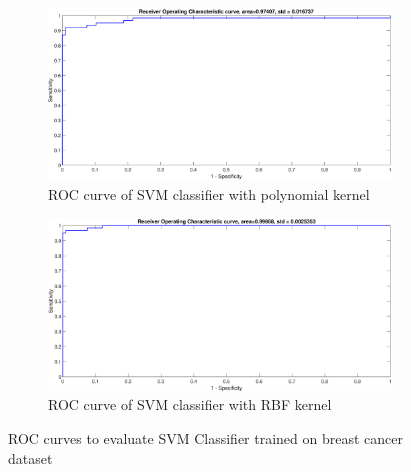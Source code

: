 \documentclass[12pt]{report}
\begin{document}
{\begin{figure}[!ht]
\begin{subfigure}{.35\textwidth}
		\includegraphics[height=.65\linewidth, width=0.9\linewidth]{breast/breast_poly_ROC.eps}
		\caption{ROC curve of SVM classifier with polynomial kernel}
		\label{fig:breast_poly_ROC}
	\end{subfigure}%
	\begin{subfigure}{.35\textwidth}
		\centering
		\captionsetup{width=0.8\linewidth}
		\includegraphics[height=.65\linewidth, width=0.9\linewidth]{breast/breast_RBF_ROC.eps}
		\caption{ROC curve of SVM classifier with RBF kernel} 
		\label{fig:breast_RBF_ROC}
	\end{subfigure}
	\caption{ROC curves to evaluate SVM Classifier trained on breast cancer dataset}
	\label{fig:breast_ROC}
\end{figure}
\begin{table}[!htpb]
	\begin{tabular}{ |p{1.2cm}|p{1.2cm}|p{1.2cm}||p{2cm}|p{1.2cm}|p{1.2cm}||p{1.2cm}|p{1.2cm}|p{1.2cm}|}
		\hline

\end{tabular}
\end{table}}
\end{document}
